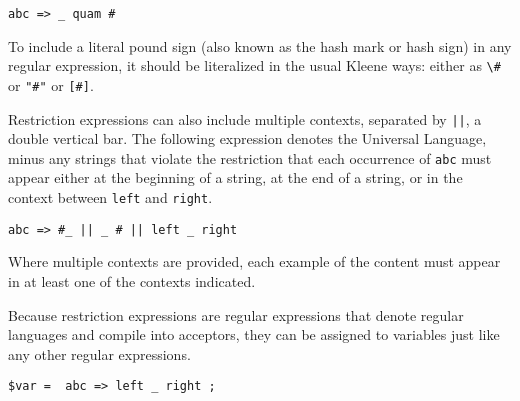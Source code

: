 \begin{Verbatim}
abc => _ quam #
\end{Verbatim}

\noindent
To include a literal pound sign (also known as the hash mark or
hash sign) in any regular expression, it should be literalized in
the usual Kleene ways:  either as \verb!\#! or \verb!"#"! or \verb![#]!. 

Restriction expressions can also include multiple contexts, separated by
\texttt{||}, a double vertical bar.  The following expression denotes the
Universal Language, minus any strings that violate the restriction that
each occurrence of \texttt{abc} must appear either at the beginning of a
string, at the end of a string, or in the context between \texttt{left}
and \texttt{right}.

\begin{Verbatim}
abc => #_ || _ # || left _ right 
\end{Verbatim}

\noindent
Where multiple contexts are provided, each example of the content
must appear in at least one of the contexts indicated.

Because restriction expressions are regular expressions that denote
regular languages and compile into acceptors, they can be assigned to
variables just like any other regular expressions.

\begin{Verbatim}
$var =  abc => left _ right ;
\end{Verbatim}


